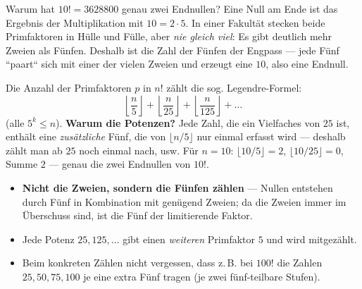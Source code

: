 


Warum hat $10!=3628800$ genau zwei Endnullen? Eine Null am Ende ist
das Ergebnis der Multiplikation mit $10=2\cdot5$. In einer Fakultät
stecken beide Primfaktoren in Hülle und Fülle, aber \emph{nie gleich
viel}: Es gibt deutlich mehr Zweien als Fünfen. Deshalb ist die Zahl der
Fünfen der Engpass --- jede Fünf ``paart`` sich mit einer der vielen
Zweien und erzeugt eine $10$, also eine Endnull.

\begin{werkzeugkasten}
Die Anzahl der Primfaktoren $p$ in $n!$ zählt die sog. Legendre-Formel:
\begin{equation}
  \left\lfloor\frac{n}{5}\right\rfloor+
  \left\lfloor\frac{n}{25}\right\rfloor+
  \left\lfloor\frac{n}{125}\right\rfloor+\dots
\end{equation}
(alle $5^k\le n$). \textbf{Warum die Potenzen?} Jede Zahl, die ein
Vielfaches von $25$ ist, enthält eine \emph{zusätzliche} Fünf, die von
$\lfloor n/5\rfloor$ nur einmal erfasst wird --- deshalb zählt man ab
$25$ noch einmal nach, usw. Für $n=10$: $\lfloor10/5\rfloor=2$,
$\lfloor10/25\rfloor=0$, Summe $2$ --- genau die zwei Endnullen von
$10!$.
\end{werkzeugkasten}

\begin{achtung}
\begin{itemize}
  \item \textbf{Nicht die Zweien, sondern die Fünfen zählen} --- Nullen
        entstehen durch Fünf in Kombination mit genügend Zweien; da die
        Zweien immer im \"Uberschuss sind, ist die Fünf der
        limitierende Faktor.
  \item Jede Potenz $25,125,\dots$ gibt einen \emph{weiteren}
        Primfaktor $5$ und wird mitgezählt.
  \item Beim konkreten Z\"ahlen nicht vergessen, dass z.\,B. bei $100!$
        die Zahlen $25,50,75,100$ je eine extra Fünf tragen (je zwei
        f\"unf-teilbare Stufen).
\end{itemize}
\end{achtung}
